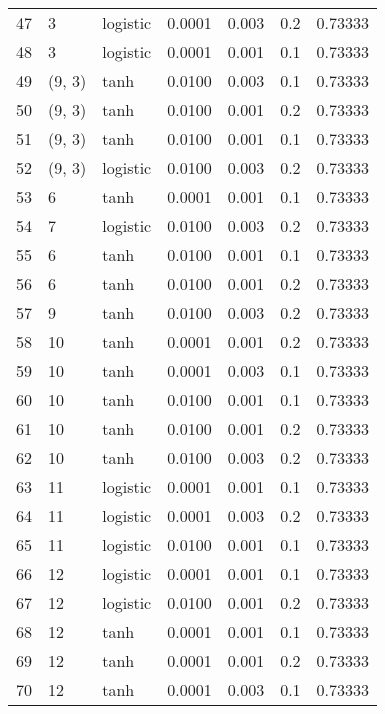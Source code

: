 \begin{tabular}{lllrrrr}
47  &           3 &  logistic &  0.0001 &  0.003 &  0.2 &   0.73333 \\
48  &           3 &  logistic &  0.0001 &  0.001 &  0.1 &   0.73333 \\
49  &      (9, 3) &      tanh &  0.0100 &  0.003 &  0.1 &   0.73333 \\
50  &      (9, 3) &      tanh &  0.0100 &  0.001 &  0.2 &   0.73333 \\
51  &      (9, 3) &      tanh &  0.0100 &  0.001 &  0.1 &   0.73333 \\
52  &      (9, 3) &  logistic &  0.0100 &  0.003 &  0.2 &   0.73333 \\
53  &           6 &      tanh &  0.0001 &  0.001 &  0.1 &   0.73333 \\
54  &           7 &  logistic &  0.0100 &  0.003 &  0.2 &   0.73333 \\
55  &           6 &      tanh &  0.0100 &  0.001 &  0.1 &   0.73333 \\
56  &           6 &      tanh &  0.0100 &  0.001 &  0.2 &   0.73333 \\
57  &           9 &      tanh &  0.0100 &  0.003 &  0.2 &   0.73333 \\
58  &          10 &      tanh &  0.0001 &  0.001 &  0.2 &   0.73333 \\
59  &          10 &      tanh &  0.0001 &  0.003 &  0.1 &   0.73333 \\
60  &          10 &      tanh &  0.0100 &  0.001 &  0.1 &   0.73333 \\
61  &          10 &      tanh &  0.0100 &  0.001 &  0.2 &   0.73333 \\
62  &          10 &      tanh &  0.0100 &  0.003 &  0.2 &   0.73333 \\
63  &          11 &  logistic &  0.0001 &  0.001 &  0.1 &   0.73333 \\
64  &          11 &  logistic &  0.0001 &  0.003 &  0.2 &   0.73333 \\
65  &          11 &  logistic &  0.0100 &  0.001 &  0.1 &   0.73333 \\
66  &          12 &  logistic &  0.0001 &  0.001 &  0.1 &   0.73333 \\
67  &          12 &  logistic &  0.0100 &  0.001 &  0.2 &   0.73333 \\
68  &          12 &      tanh &  0.0001 &  0.001 &  0.1 &   0.73333 \\
69  &          12 &      tanh &  0.0001 &  0.001 &  0.2 &   0.73333 \\
70  &          12 &      tanh &  0.0001 &  0.003 &  0.1 &   0.73333 \\

\end{tabular}
